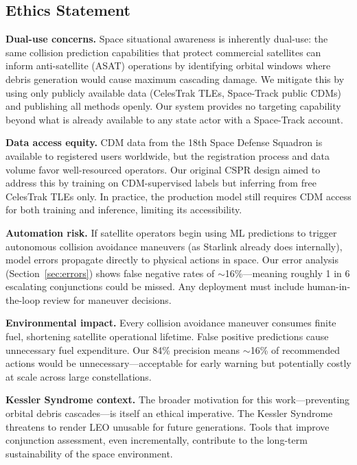 \documentclass{article}
\begin{document}
\subsection{Ethics Statement}
\label{sec:ethics}

\textbf{Dual-use concerns.} Space situational awareness is inherently dual-use: the same collision prediction capabilities that protect commercial satellites can inform anti-satellite (ASAT) operations by identifying orbital windows where debris generation would cause maximum cascading damage. We mitigate this by using only publicly available data (CelesTrak TLEs, Space-Track public CDMs) and publishing all methods openly. Our system provides no targeting capability beyond what is already available to any state actor with a Space-Track account.

\textbf{Data access equity.} CDM data from the 18th Space Defense Squadron is available to registered users worldwide, but the registration process and data volume favor well-resourced operators. Our original CSPR design aimed to address this by training on CDM-supervised labels but inferring from free CelesTrak TLEs only. In practice, the production model still requires CDM access for both training and inference, limiting its accessibility.

\textbf{Automation risk.} If satellite operators begin using ML predictions to trigger autonomous collision avoidance maneuvers (as Starlink already does internally), model errors propagate directly to physical actions in space. Our error analysis (Section~\ref{sec:errors}) shows false negative rates of $\sim$16\%---meaning roughly 1 in 6 escalating conjunctions could be missed. Any deployment must include human-in-the-loop review for maneuver decisions.

\textbf{Environmental impact.} Every collision avoidance maneuver consumes finite fuel, shortening satellite operational lifetime. False positive predictions cause unnecessary fuel expenditure. Our 84\% precision means $\sim$16\% of recommended actions would be unnecessary---acceptable for early warning but potentially costly at scale across large constellations.

\textbf{Kessler Syndrome context.} The broader motivation for this work---preventing orbital debris cascades---is itself an ethical imperative. The Kessler Syndrome threatens to render LEO unusable for future generations. Tools that improve conjunction assessment, even incrementally, contribute to the long-term sustainability of the space environment.
\end{document}

